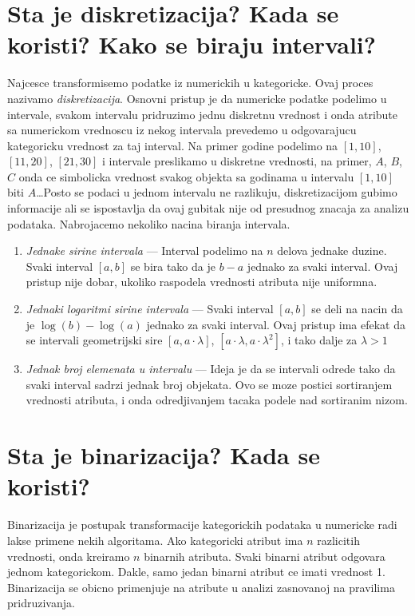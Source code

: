 \documentclass[a4paper]{article}
\begin{document}
\section{Sta je diskretizacija? Kada se koristi? Kako se biraju intervali?}
\label{sect_diskretizacija}
Najcesce transformisemo podatke iz numerickih u kategoricke. Ovaj proces nazivamo
\emph{diskretizacija}. Osnovni pristup je da numericke podatke podelimo u intervale, svakom
intervalu pridruzimo jednu diskretnu vrednost i onda atribute sa numerickom vrednoscu iz nekog
intervala prevedemo u odgovarajucu kategoricku vrednost za taj interval. Na primer godine podelimo
na \([1, 10]\), \([11, 20]\), \([21, 30]\) i intervale preslikamo u diskretne vrednosti, na primer,
\(A\), \(B\), \(C\) onda ce simbolicka vrednost svakog objekta sa godinama u intervalu \([1, 10]\)
biti \(A\)\ldots Posto se podaci u jednom intervalu ne razlikuju, diskretizacijom gubimo informacije
ali se ispostavlja da ovaj gubitak nije od presudnog znacaja za analizu podataka. Nabrojacemo
nekoliko nacina biranja intervala.
\begin{enumerate}
    \item \emph{Jednake sirine intervala} --- Interval podelimo na \(n\) delova jednake duzine.
        Svaki interval \([a, b]\) se bira tako da je \(b - a\) jednako za svaki interval. Ovaj
        pristup nije dobar, ukoliko raspodela vrednosti atributa nije uniformna.
    \item \emph{Jednaki logaritmi sirine intervala} --- Svaki interval \([a, b]\) se deli na nacin
        da je \(\log(b) - \log(a)\) jednako za svaki interval. Ovaj pristup ima efekat da se
        intervali geometrijski sire \([a, a \cdot \lambda]\),
        \([a\cdot \lambda, a \cdot \lambda^2]\), i tako dalje za \(\lambda > 1\)
    \item \label{podela_intervala:jednak_br_el} \emph{Jednak broj elemenata u intervalu} --- Ideja
        je da se intervali odrede tako da svaki interval sadrzi jednak broj objekata. Ovo se moze
        postici sortiranjem vrednosti atributa, i onda odredjivanjem tacaka podele nad sortiranim
        nizom.
\end{enumerate}

\section{Sta je binarizacija? Kada se koristi?}
\emph{}Binarizacija je postupak transformacije kategorickih podataka u numericke radi lakse primene
nekih algoritama. Ako kategoricki atribut ima \(n\) razlicitih vrednosti, onda kreiramo \(n\)
binarnih atributa. Svaki binarni atribut odgovara jednom kategorickom. Dakle, samo jedan binarni
atribut ce imati vrednost 1. Binarizacija se obicno primenjuje na atribute u analizi zasnovanoj na
pravilima
pridruzivanja.
\end{document}

